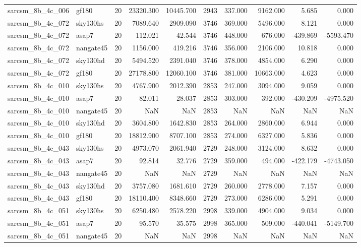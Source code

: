 \documentclass{article}
\begin{document}
\begin{longtable}{llrrrrrrrr}
sarcsm\_8b\_4c\_006 & gf180 & 20 & 23320.300 & 10445.700 & 2943 & 337.000 & 9162.000 & 5.685 & 0.000 \\
sarcsm\_8b\_4c\_072 & sky130hs & 20 & 7089.640 & 2909.090 & 3746 & 369.000 & 5496.000 & 8.121 & 0.000 \\
sarcsm\_8b\_4c\_072 & asap7 & 20 & 112.021 & 42.544 & 3746 & 448.000 & 676.000 & -439.869 & -5593.470 \\
sarcsm\_8b\_4c\_072 & nangate45 & 20 & 1156.000 & 419.216 & 3746 & 356.000 & 2106.000 & 10.818 & 0.000 \\
sarcsm\_8b\_4c\_072 & sky130hd & 20 & 5494.520 & 2391.040 & 3746 & 378.000 & 4854.000 & 6.290 & 0.000 \\
sarcsm\_8b\_4c\_072 & gf180 & 20 & 27178.800 & 12060.100 & 3746 & 381.000 & 10663.000 & 4.623 & 0.000 \\
sarcsm\_8b\_4c\_010 & sky130hs & 20 & 4767.900 & 2012.390 & 2853 & 247.000 & 3094.000 & 9.059 & 0.000 \\
sarcsm\_8b\_4c\_010 & asap7 & 20 & 82.011 & 28.037 & 2853 & 303.000 & 392.000 & -430.209 & -4975.520 \\
sarcsm\_8b\_4c\_010 & nangate45 & 20 & NaN & NaN & 2853 & NaN & NaN & NaN & NaN \\
sarcsm\_8b\_4c\_010 & sky130hd & 20 & 3604.800 & 1642.830 & 2853 & 264.000 & 2860.000 & 6.944 & 0.000 \\
sarcsm\_8b\_4c\_010 & gf180 & 20 & 18812.900 & 8707.100 & 2853 & 274.000 & 6327.000 & 5.836 & 0.000 \\
sarcsm\_8b\_4c\_043 & sky130hs & 20 & 4973.070 & 2061.940 & 2729 & 248.000 & 3124.000 & 8.632 & 0.000 \\
sarcsm\_8b\_4c\_043 & asap7 & 20 & 92.814 & 32.776 & 2729 & 359.000 & 494.000 & -422.179 & -4743.050 \\
sarcsm\_8b\_4c\_043 & nangate45 & 20 & NaN & NaN & 2729 & NaN & NaN & NaN & NaN \\
sarcsm\_8b\_4c\_043 & sky130hd & 20 & 3757.080 & 1681.610 & 2729 & 260.000 & 2778.000 & 7.157 & 0.000 \\
sarcsm\_8b\_4c\_043 & gf180 & 20 & 18110.400 & 8348.660 & 2729 & 273.000 & 6286.000 & 5.291 & 0.000 \\
sarcsm\_8b\_4c\_051 & sky130hs & 20 & 6250.480 & 2578.220 & 2998 & 339.000 & 4904.000 & 9.034 & 0.000 \\
sarcsm\_8b\_4c\_051 & asap7 & 20 & 95.570 & 35.575 & 2998 & 365.000 & 509.000 & -440.041 & -5149.700 \\
sarcsm\_8b\_4c\_051 & nangate45 & 20 & NaN & NaN & 2998 & NaN & NaN & NaN & NaN \\

\end{longtable}
\end{document}
